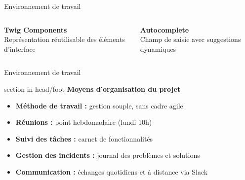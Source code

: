\documentclass{beamer}
\begin{document}
\begin{frame}{Environnement de travail}
\begin{center}
\begin{minipage}{0.9\textwidth}
\begin{columns}[T, onlytextwidth]
      				\begin{minipage}[t][2cm][t]{\linewidth}
        					\raggedright
        					\textbf{Twig Components} \\
        					Représentation réutilisable des éléments d'interface
      				\end{minipage}
      				\vspace{0.7em}
          			\pause
      
      				\begin{minipage}[t][2cm][t]{\linewidth}
        					\raggedright
        					\textbf{Autocomplete} \\
        					Champ de saisie avec suggestions dynamiques
      				\end{minipage}
      
  			\end{columns}
		\end{minipage}
	\end{center}
	\vfill
\end{frame}

\begin{frame}[label=env]{Environnement de travail}
    \begin{beamercolorbox}[wd=\paperwidth,ht=1.5em,dp=0.5em,leftskip=0.5cm]{section in head/foot}
        \large \textbf{Moyens d'organisation du projet}
    \end{beamercolorbox}
    \vspace{0.5em}
    \begin{center}
\begin{minipage}{0.9\textwidth}
    \begin{itemize}
        \item \textbf{Méthode de travail :} gestion souple, sans cadre agile
        \item \textbf{Réunions :} point hebdomadaire (lundi 10h)
        \item \textbf{Suivi des tâches :} carnet de fonctionnalités
        \item \textbf{Gestion des incidents :} journal des problèmes et solutions
        \item \textbf{Communication :} échanges quotidiens et à distance via Slack
    \end{itemize}
\end{minipage}

    \end{center}
    \vfill
\end{frame}
\end{document}

